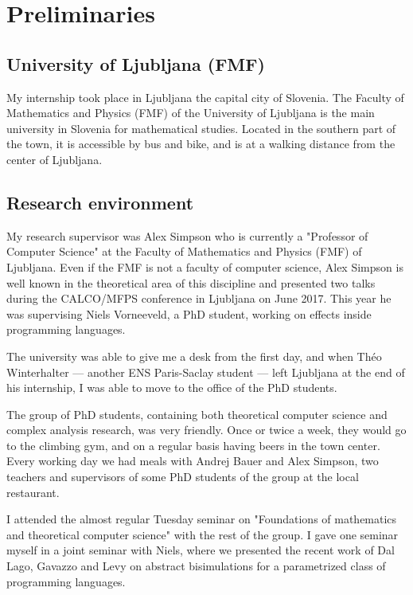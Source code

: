 \section{Preliminaries}


\subsection{University of Ljubljana (FMF)}

My internship took place in Ljubljana the capital city of Slovenia.
The Faculty of Mathematics and Physics (FMF) of the University of Ljubljana is 
the main university in Slovenia for mathematical studies. Located 
in the southern part of the town, it is accessible by bus and bike,
and is at a walking distance from the center of Ljubljana.

\subsection{Research environment}

My research supervisor was Alex Simpson
who is currently a 
"Professor of Computer Science" at the Faculty of Mathematics and Physics (FMF)
of Ljubljana.
Even if the FMF is not a faculty of computer science,
Alex Simpson is well known in the theoretical area of 
this discipline and presented two talks during the 
CALCO/MFPS conference in Ljubljana on June 2017. 
This year he was 
supervising Niels Vorneeveld, a PhD student, working 
on effects inside programming languages.

The university was able to give me a desk from the first 
day, and when Théo Winterhalter — another 
ENS Paris-Saclay student — left Ljubljana at the end 
of his internship, I was able to move to the office of 
the PhD students. 

The group of PhD students, containing both theoretical 
computer science and complex analysis research,
was very friendly. Once or twice a week, they would 
go to the climbing gym, and on a regular basis having beers 
in the town center. Every working day we had meals 
with Andrej Bauer and Alex Simpson, two teachers and 
supervisors of some PhD students of the group at the 
local restaurant.

I attended the almost regular 
Tuesday seminar on "Foundations of mathematics and theoretical computer science"
with the rest of the group.
I gave one seminar myself in a joint seminar with Niels, where 
we presented the recent work of Dal Lago, Gavazzo and Levy \cite{Ugo2017} on 
abstract bisimulations for a parametrized class of programming languages.

